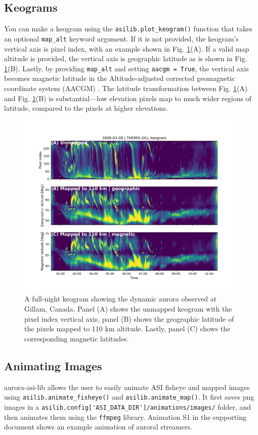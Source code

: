 \documentclass[utf8]{FrontiersinHarvard} %
\begin{document}
\subsection{Keograms}
You can make a keogram using the \verb|asilib.plot_keogram()| function that takes an optional \verb|map_alt| keyword argument. If it is not provided, the keogram's vertical axis is pixel index, with an example shown in Fig. \ref{fig3}(A). If a valid map altitude is provided, the vertical axis is geographic latitude as is shown in Fig. \ref{fig3}(B). Lastly, by providing \verb|map_alt| and setting \verb|aacgm = True|, the vertical axis becomes magnetic latitude in the Altitude-adjusted corrected geomagnetic coordinate system (AACGM) \citep{Shepherd2014}.
The latitude transformation between Fig. \ref{fig3}(A) and Fig. \ref{fig3}(B) is substantial---low elevation pixels map to much wider regions of latitude, compared to the pixels at higher elevations.

\begin{figure}
      \includegraphics[width=\textwidth]{figures/fig3.jpg}
      \caption{A full-night keogram showing the dynamic aurora observed at Gillam, Canada. Panel (A) shows the unmapped keogram with the pixel index vertical axis, panel (B) shows the geographic latitude of the pixels mapped to 110 km altitude. Lastly, panel (C) shows the corresponding magnetic latitudes.}
      \label{fig3}
\end{figure}


\subsection{Animating Images}
aurora-asi-lib allows the user to easily animate ASI fisheye and mapped images using \verb|asilib.animate_fisheye()| and \verb|asilib.animate_map()|. It first saves png images in a \verb|asilib.config['ASI_DATA_DIR']/animations/images/| folder, and then animates them using the \verb|ffmpeg| \cite{ffmpeg} library. Animation S1 in the supporting document shows an example animation of auroral streamers.
\end{document}
